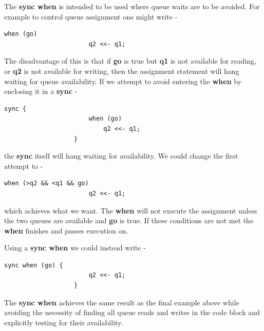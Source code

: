             The {\bf sync when} is intended to be used where queue waits are to be
            avoided. For example to control queue assignment one might write -
            \begin{lstlisting}[gobble=12, language=threepl]
                   when (go)
                       q2 <<- q1;
            \end{lstlisting}
            The disadvantage of this is that if {\bf go} is true but {\bf q1} is not
            available for reading, or {\bf q2} is not available for writing, then
            the assignment statement will hang waiting for queue availability.
            If we attempt to avoid entering the {\bf when} by enclosing it in
            a {\bf sync} -
            \begin{lstlisting}[gobble=12, language=threepl]
                   sync {
                       when (go)
                           q2 <<- q1;
                   }
            \end{lstlisting}
            the {\bf sync} itself will hang waiting for availability. We could
            change the first attempt to -
            \begin{lstlisting}[gobble=12, language=threepl]
                   when (>q2 && <q1 && go)
                       q2 <<- q1;
            \end{lstlisting}
            which achieves what we want. The {\bf when} will not execute the assignment
            unless the two queues are available and {\bf go} is true. If these
            conditions are not met the {\bf when} finishes and passes execution on.

            Using a {\bf sync when} we could instead write -
            \begin{lstlisting}[gobble=12, language=threepl]
                   sync when (go) {
                       q2 <<- q1;
                   }
            \end{lstlisting}
            The {\bf sync when} achieves the same result as the final example above
            while avoiding the necessity of finding all queue reads and writes in
            the code block and explicitly testing for their availability.
            
